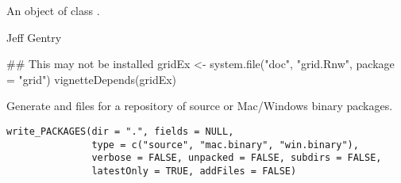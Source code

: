 %
\begin{Value}
An object of class .
\end{Value}
%
\begin{Author}\relax
 Jeff Gentry 
\end{Author}
%
\begin{SeeAlso}\relax
{}
\end{SeeAlso}
%
\begin{Examples}
\begin{ExampleCode}
## This may not be installed
gridEx <- system.file("doc", "grid.Rnw", package = "grid")
vignetteDepends(gridEx)
\end{ExampleCode}
\end{Examples}
%
\begin{Description}\relax
Generate  and  files for a
repository of source or Mac/Windows binary packages.
\end{Description}
%
\begin{Usage}
\begin{verbatim}
write_PACKAGES(dir = ".", fields = NULL,
               type = c("source", "mac.binary", "win.binary"),
               verbose = FALSE, unpacked = FALSE, subdirs = FALSE,
               latestOnly = TRUE, addFiles = FALSE)
\end{verbatim}
\end{Usage}
%
